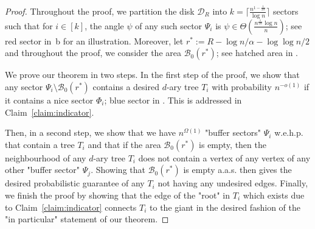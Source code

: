 \documentclass[letterpaper,11pt]{article}
\newcommand{\wehp}{w.e.h.p.\xspace}
\newcommand{\aas}{a.a.s.\xspace}
\newcommand{\B}{\mathcal B}
\newcommand{\1}{\mathbb I}
\begin{document}
%
\theoremregulartree*
%
\begin{proof}
Throughout the proof, we partition the disk $\mathcal{D}_R$ into $k = \big\lceil \frac{n^{1-\frac{1}{2\alpha}}}{\log n}\rceil$ sectors such that for $i \in [k]$, the angle $\psi$ of any such sector $\Psi_i$ is $\psi \in \Theta\left(\frac{n^{\frac{1}{2\alpha}}\log n}{n}\right)$; see red sector in~b for an illustration. Moreover, let $r^* := R - \log n/\alpha - \log\log n /2$ and throughout the proof, we consider the area $\B_0(r^*)$; see hatched area in .

We prove our theorem in two steps. In the first step of the proof, we show that any sector $\Psi_i\setminus\B_0(r^*)$ contains a desired $d$-ary tree $T_i$ with probability $n^{-o(1)}$ if it contains a nice sector $\Phi_i$; blue sector in . This is addressed in Claim~\ref{claim:indicator}. 

Then, in a second step, we show that we have $n^{\Omega(1)}$ "buffer sectors" $\Psi_i$ \wehp that contain a tree $T_i$ and that if the area $\B_0(r^*)$ is empty, then the neighbourhood of any $d$-ary tree $T_i$ does not contain a vertex of any vertex of any other "buffer sector" $\Psi_j$. Showing that $\B_0(r^*)$ is empty \aas then gives the desired probabilistic guarantee of any $T_i$ not having any undesired edges. Finally, we finish the proof by showing that the edge of the "root" in $T_i$  which exists due to Claim~\ref{claim:indicator} connects $T_i$ to the giant in the desired fashion of the "in particular" statement of our theorem.


\end{proof}
\end{document}
